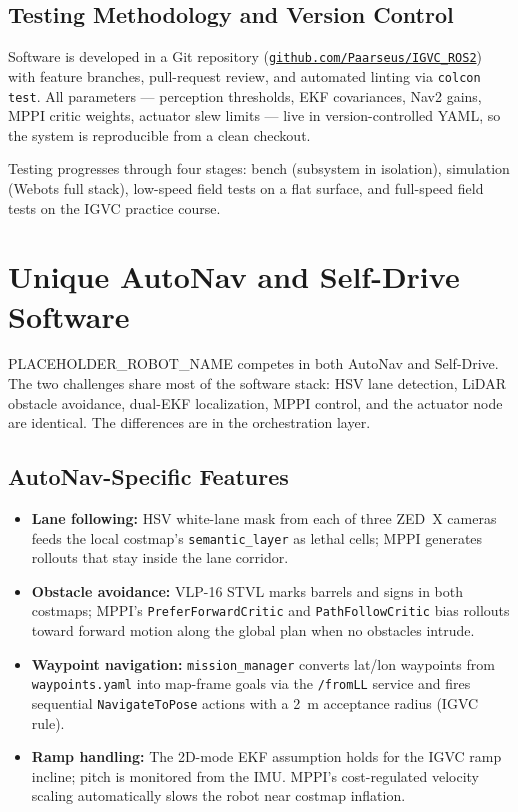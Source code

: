 \documentclass[11pt, letterpaper]{article}
\newcommand{\robotname}{PLACEHOLDER\_ROBOT\_NAME}
\begin{document}
\subsection{Testing Methodology and Version Control}

Software is developed in a Git repository (\href{https://github.com/Paarseus/IGVC_ROS2}
{\texttt{github.com/Paarseus/IGVC\_ROS2}}) with feature branches, pull-request review, and
automated linting via \texttt{colcon test}. All parameters --- perception thresholds, EKF
covariances, Nav2 gains, MPPI critic weights, actuator slew limits --- live in
version-controlled YAML, so the system is reproducible from a clean checkout.

Testing progresses through four stages: bench (subsystem in isolation), simulation (Webots
full stack), low-speed field tests on a flat surface, and full-speed field tests on the
IGVC practice course.

\section{Unique AutoNav and Self-Drive Software}

\robotname{} competes in both AutoNav and Self-Drive. The two challenges share most of the
software stack: HSV lane detection, LiDAR obstacle avoidance, dual-EKF localization, MPPI
control, and the actuator node are identical. The differences are in the orchestration layer.

\subsection{AutoNav-Specific Features}

\begin{itemize}
    \item \textbf{Lane following:} HSV white-lane mask from each of three ZED~X cameras feeds the local costmap's \texttt{semantic\_layer} as lethal cells; MPPI generates rollouts that stay inside the lane corridor.
    \item \textbf{Obstacle avoidance:} VLP-16 STVL marks barrels and signs in both costmaps; MPPI's \texttt{PreferForwardCritic} and \texttt{PathFollowCritic} bias rollouts toward forward motion along the global plan when no obstacles intrude.
    \item \textbf{Waypoint navigation:} \texttt{mission\_manager} converts lat/lon waypoints from \texttt{waypoints.yaml} into map-frame goals via the \texttt{/fromLL} service and fires sequential \texttt{NavigateToPose} actions with a 2~m acceptance radius (IGVC rule).
    \item \textbf{Ramp handling:} The 2D-mode EKF assumption holds for the IGVC ramp incline; pitch is monitored from the IMU. MPPI's cost-regulated velocity scaling automatically slows the robot near costmap inflation.
\end{itemize}
\end{document}
